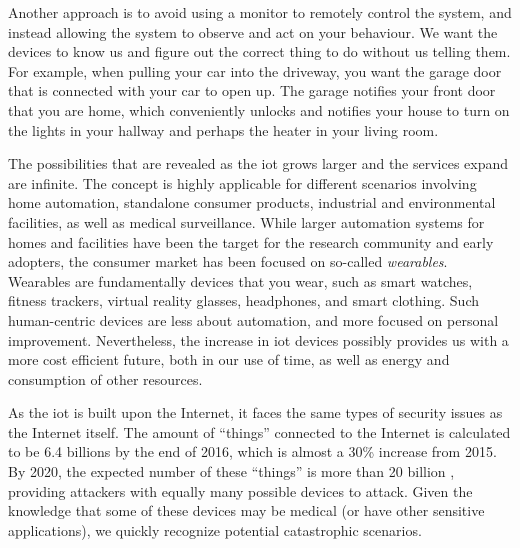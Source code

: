 Another approach is to avoid using a monitor to remotely control the system, and instead allowing the system to observe and act on your behaviour. We want the devices to know us and figure out the correct thing to do without us telling them. For example, when pulling your car into the driveway, you want the garage door that is connected with your car to open up. The garage notifies your front door that you are home, which conveniently unlocks and notifies your house to turn on the lights in your hallway and perhaps the heater in your living room.




The possibilities that are revealed as the \gls{iot} grows larger and the services expand are infinite. The concept is highly applicable for different scenarios involving home automation, standalone consumer products, industrial and environmental facilities, as well as medical surveillance. While larger automation systems for homes and facilities have been the target for the research community and early adopters, the consumer market has been focused on so-called \emph{wearables}. Wearables are fundamentally devices that you wear, such as smart watches, fitness trackers, virtual reality glasses, headphones, and smart clothing. Such human-centric devices are less about automation, and more focused on personal improvement. Nevertheless, the increase in \gls{iot} devices possibly provides us with a more cost efficient future, both in our use of time, as well as energy and consumption of other resources.


As the \gls{iot} is built upon the Internet, it faces the same types of security issues as the Internet itself. The amount of ``things'' connected to the Internet is calculated to be 6.4 billions by the end of 2016, which is almost a 30\% increase from 2015. By 2020, the expected number of these ``things'' is more than 20 billion \cite{iot-gartner}, providing attackers with equally many possible devices to attack. Given the knowledge that some of these devices may be medical (or have other sensitive applications), we quickly recognize potential catastrophic scenarios.


